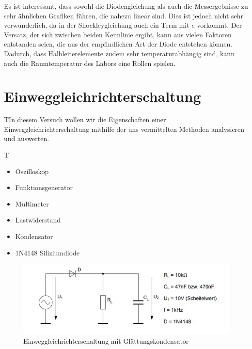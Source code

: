 \documentclass{article}
\begin{document}
Es ist interessant, dass sowohl die Diodengleichung als auch die Messergebnisse zu sehr ähnlichen Grafiken führen, die nahezu linear sind. Dies ist jedoch nicht sehr verwunderlich, da in der Shockleygleichung auch ein Term mit $e$ vorkommt. Der Versatz, der sich zwischen beiden Kennlinie ergibt, kann aus vielen Faktoren entstanden seien, die aus der empfindlichen Art der Diode entstehen können. Dadurch, dass Halbleiterelemente zudem sehr temperaturabhängig sind, kann auch die Raumtemperatur des Labors eine Rollen spielen.

\newpage

\section{Einweggleichrichterschaltung}
\begin{task}
  TIn diesem Versuch wollen wir die Eigenschaften einer Einweggleichrichterschaltung mithilfe der uns 
  vermittelten Methoden analysieren und auswerten.
\end{task}

\begin{devlist}
  T\begin{itemize}
    \item Oszilloskop
    \item Funktionsgenerator
    \item Multimeter
    \item Lastwiderstand
    \item Kondensator
    \item 1N4148 Siliziumdiode
  \end{itemize}
\end{devlist}

\begin{figure}[h]
  \begin{center}
    \includegraphics{../assets/images/EL1P2/aufgabe 3 schaltung.JPG}
    \caption{Einweggleichrichterschaltung mit Glättungskondensator}
  \end{center}
\end{figure}
\end{document}
